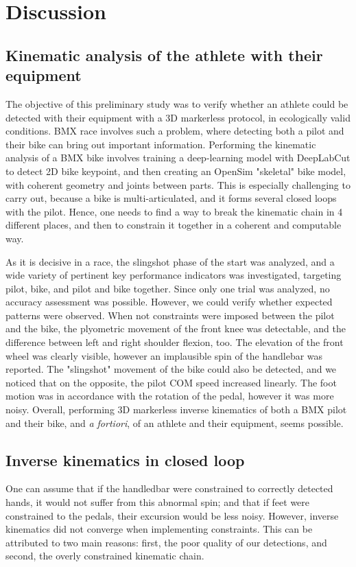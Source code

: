 \FloatBarrier
\section{Discussion}
\subsection{Kinematic analysis of the athlete with their equipment}
The objective of this preliminary study was to verify whether an athlete could be detected with their equipment with a 3D markerless protocol, in ecologically valid conditions. BMX race involves such a problem, where detecting both a pilot and their bike can bring out important information. Performing the kinematic analysis of a BMX bike involves training a deep-learning model with DeepLabCut to detect 2D bike keypoint, and then creating an OpenSim "skeletal" bike model, with coherent geometry and joints between parts. This is especially challenging to carry out, because a bike is multi-articulated, and it forms several closed loops with the pilot. Hence, one needs to find a way to break the kinematic chain in 4 different places, and then to constrain it together in a coherent and computable way.

As it is decisive in a race, the slingshot phase of the start was analyzed, and a wide variety of pertinent key performance indicators was investigated, targeting pilot, bike, and pilot and bike together. Since only one trial was analyzed, no accuracy assessment was possible. However, we could verify whether expected patterns were observed. When not constraints were imposed between the pilot and the bike, the plyometric movement of the front knee was detectable, and the difference between left and right shoulder flexion, too. The elevation of the front wheel was clearly visible, however an implausible spin of the handlebar was reported. The "slingshot" movement of the bike could also be detected, and we noticed that on the opposite, the pilot COM speed increased linearly. The foot motion was in accordance with the rotation of the pedal, however it was more noisy. Overall, performing 3D markerless inverse kinematics of both a BMX pilot and their bike, and \emph{a fortiori}, of an athlete and their equipment, seems possible.


\subsection{Inverse kinematics in closed loop}
One can assume that if the handledbar were constrained to correctly detected hands, it would not suffer from this abnormal spin; and that if feet were constrained to the pedals, their excursion would be less noisy. However, inverse kinematics did not converge when implementing constraints. This can be attributed to two main reasons: first, the poor quality of our detections, and second, the overly constrained kinematic chain. 

